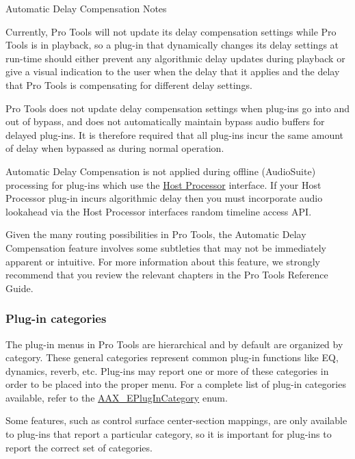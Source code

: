 Automatic Delay Compensation Notes 
\begin{DoxyItemize}
\item Currently, Pro Tools will not update its delay compensation settings while Pro Tools is in playback, so a plug-\/in that dynamically changes its delay settings at run-\/time should either prevent any algorithmic delay updates during playback or give a visual indication to the user when the delay that it applies and the delay that Pro Tools is compensating for different delay settings. 
\item Pro Tools does not update delay compensation settings when plug-\/ins go into and out of bypass, and does not automatically maintain bypass audio buffers for delayed plug-\/ins. It is therefore required that all plug-\/ins incur the same amount of delay when bypassed as during normal operation.  
\item Automatic Delay Compensation is not applied during offline (Audio\+Suite) processing for plug-\/ins which use the \hyperlink{a00101}{Host Processor} interface. If your Host Processor plug-\/in incurs algorithmic delay then you must incorporate audio lookahead via the Host Processor interface\textquotesingle{}s random timeline access A\+P\+I.  
\item Given the many routing possibilities in Pro Tools, the Automatic Delay Compensation feature involves some subtleties that may not be immediately apparent or intuitive. For more information about this feature, we strongly recommend that you review the relevant chapters in the Pro Tools Reference Guide.  
\end{DoxyItemize}

\hypertarget{a00360_subsection__plugin_categories}{}\subsubsection{Plug-\/in categories}\label{a00360_subsection__plugin_categories}
 The plug-\/in menus in Pro Tools are hierarchical and by default are organized by category. These general categories represent common plug-\/in functions like E\+Q, dynamics, reverb, etc. Plug-\/ins may report one or more of these categories in order to be placed into the proper menu. For a complete list of plug-\/in categories available, refer to the \hyperlink{a00206_aef9637518fb1ac0e2f403444c73aba4a}{A\+A\+X\+\_\+\+E\+Plug\+In\+Category} enum.

Some features, such as control surface center-\/section mappings, are only available to plug-\/ins that report a particular category, so it is important for plug-\/ins to report the correct set of categories.

